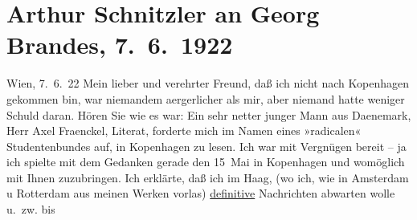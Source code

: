 

               \section[Arthur Schnitzler an Georg Brandes, 7. 6. 1922]{ Arthur Schnitzler an Georg Brandes, 7. 6. 1922}\nopagebreak{}\rehead{ }\begin{ledgroupsized}[t]{13cm}\normalsize\beginnumbering{} \toendnotes[C]{\smallbreak\pagebreak[2]} 
\toendnotes[C]{\smallbreak}\pstart
           \raggedleft{}{\pb}Wien, 7. 6. 22\pend
           \pstart
           Mein lieber und verehrter Freund, daß ich nicht nach Kopenhagen gekommen bin, war niemandem
                    aergerlicher als mir, aber niemand hatte weniger Schuld daran. Hören Sie wie es
                    war: Ein sehr netter junger Mann aus Daenemark, Herr Axel Fraenckel,
                    Literat, forderte mich im Namen eines »radicalen« Studentenbundes auf, in Kopenhagen zu lesen. Ich war mit Vergnügen
                    bereit – ja ich spielte mit dem Gedanken gerade den 15 Mai in Kopenhagen und womöglich mit Ihnen
               zuzubringen. Ich erklärte, daß ich im Haag, (wo
                    ich, wie in Amsterdam u Rotterdam aus meinen Werken vorlas) \uline{definitive}{ } Nachrichten abwarten wolle u. zw. bis

\end{ledgroupsized}
